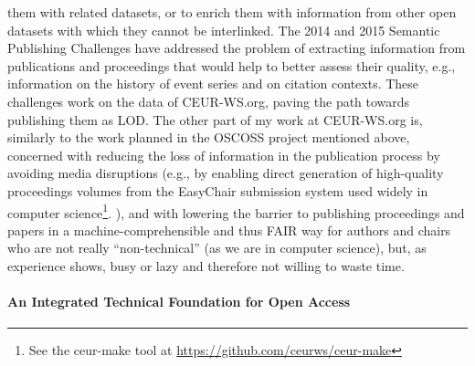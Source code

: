 \documentclass[a4paper,USenglish]{dagrep}
\begin{document}
them with related datasets, or to enrich them with information from other open
datasets with which they cannot be interlinked.
The 2014 and 2015 Semantic Publishing Challenges have addressed the problem of
extracting information from publications and proceedings that would help to
better assess their quality, e.g., information on the history of event series
and on citation contexts.
These challenges work on the data of CEUR-WS.org, paving the path towards
publishing them as LOD.
The other part of my work at CEUR-WS.org is, similarly to the work planned in
the OSCOSS project mentioned above, concerned with reducing the loss of
information in the publication process by avoiding media disruptions (e.g., by
enabling direct generation of high-quality proceedings volumes from the
EasyChair submission system used widely in computer science\footnote{%
See the ceur-make tool at \url{https://github.com/ceurws/ceur-make}}.%
), and with lowering the barrier to publishing proceedings and papers in a
machine-comprehensible and thus FAIR way for authors and chairs who are not
really ``non-technical'' (as we are in computer science), but, as experience
shows, busy or lazy and therefore not willing to waste time.

\paragraph*{An Integrated Technical Foundation for Open Access}
\end{document}
